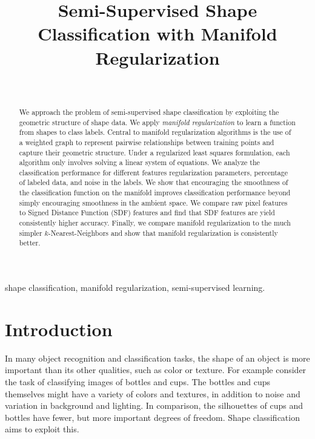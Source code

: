 \documentclass[anon,11pt]{9520} %
\title[Semi-Supervised Shape Classification]{Semi-Supervised Shape Classification with Manifold Regularization}
\author{\Name{Stanislav Nikolov}
\Email{snikolov@mit.edu}\\}
\begin{document}
\maketitle





\begin{abstract}
We approach the problem of semi-supervised shape classification by exploiting
the geometric structure of shape data. We apply {\em manifold regularization} to
learn a function from shapes to class labels. Central to manifold regularization
algorithms is the use of a weighted graph to represent pairwise relationships
between training points and capture their geometric structure. Under a
regularized least squares formulation, each algorithm only involves solving a
linear system of equations. We analyze the classification performance for
different features regularization parameters, percentage of labeled data, and
noise in the labels.  We show that encouraging the smoothness of the
classification function on the manifold improves classification performance
beyond simply encouraging smoothness in the ambient space. We compare raw pixel
features to Signed Distance Function (SDF) features and find that SDF features
are yield consistently higher accuracy. Finally, we compare manifold
regularization to the much simpler $k$-Nearest-Neighbors and show that manifold
regularization is consistently better.
\end{abstract}

\begin{keywords}
shape classification, manifold regularization, semi-supervised learning.
\end{keywords}

\section{Introduction}

In many object recognition and classification tasks, the shape of an object is
more important than its other qualities, such as color or texture. For example
consider the task of classifying images of bottles and cups. The bottles and
cups themselves might have a variety of colors and textures, in addition to
noise and variation in background and lighting. In comparison, the silhouettes
of cups and bottles have fewer, but more important degrees of freedom. Shape
classification aims to exploit this. 
\end{document}
